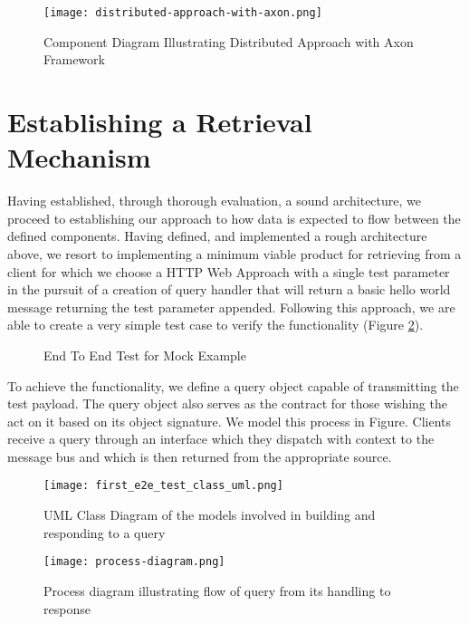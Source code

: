 \begin{figure}[h!]
	\centering
	\texttt{[image: distributed-approach-with-axon.png]}
	\caption{Component Diagram Illustrating Distributed Approach with Axon Framework}
	\label{fig:distributed-approach}
\end{figure}

\section{Establishing a Retrieval Mechanism}

Having established, through thorough evaluation, a sound architecture, we proceed to establishing our approach to how data is expected to flow between the defined components. Having defined, and implemented a rough architecture above, we resort to implementing a minimum viable product for retrieving from a client for which we choose a HTTP Web Approach with a single test parameter in the pursuit of a creation of query handler that will return a basic hello world message returning the test parameter appended. Following this approach, we are able to create a very simple test case to verify the functionality (Figure \ref{fig:e2eMockTest}).

\begin{figure}[h!]
		\centering
		
		\caption{End To End Test for Mock Example}
		\label{fig:e2eMockTest}
\end{figure}

To achieve the functionality, we define a query object capable of transmitting the test payload. The query object also serves as the contract for those wishing the act on it based on its object signature. We model this process in Figure. Clients receive a query through an interface which they dispatch with context to the message bus and which is then returned from the appropriate source. 

\begin{figure}[h!]
	\centering
	\texttt{[image: first\_e2e\_test\_class\_uml.png]}
	\caption{UML Class Diagram of the models involved in building and responding to a query}
	\label{fig:firste2etestclassuml}
\end{figure}

\begin{figure}[h!]
	\centering
	\texttt{[image: process-diagram.png]}
	\caption{Process diagram illustrating flow of query from its handling to response}
	\label{fig:processSequenceQueryFlow}
\end{figure}

